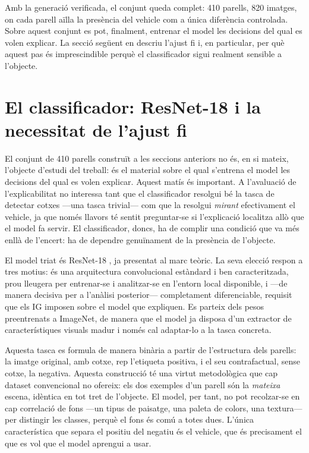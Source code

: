 Amb la generació verificada, el conjunt queda complet: 410 parells, 820 imatges, on cada parell aïlla la presència del vehicle com a única diferència controlada. Sobre aquest conjunt es pot, finalment, entrenar el model les decisions del qual es volen explicar. La secció següent en descriu l'ajust fi i, en particular, per què aquest pas és imprescindible perquè el classificador sigui realment sensible a l'objecte.

\section{El classificador: ResNet-18 i la necessitat de l'ajust fi} \label{sec:classificador}
El conjunt de 410 parells construït a les seccions anteriors no és, en si mateix, l'objecte d'estudi del treball: és el material sobre el qual s'entrena el model les decisions del qual es volen explicar. Aquest matís és important. A l'avaluació de l'explicabilitat no interessa tant que el classificador resolgui bé la tasca de detectar cotxes —una tasca trivial— com que la resolgui \emph{mirant} efectivament el vehicle, ja que només llavors té sentit preguntar-se si l'explicació localitza allò que el model fa servir. El classificador, doncs, ha de complir una condició que va més enllà de l'encert: ha de dependre genuïnament de la presència de l'objecte.

El model triat és ResNet-18 \cite{He2016}, ja presentat al marc teòric. La seva elecció respon a tres motius: és una arquitectura convolucional estàndard i ben caracteritzada, prou lleugera per entrenar-se i analitzar-se en l'entorn local disponible, i —de manera decisiva per a l'anàlisi posterior— completament diferenciable, requisit que els \ac{IG} imposen sobre el model que expliquen. Es parteix dels pesos preentrenats a ImageNet, de manera que el model ja disposa d'un extractor de característiques visuals madur i només cal adaptar-lo a la tasca concreta.

Aquesta tasca es formula de manera binària a partir de l'estructura dels parells: la imatge original, amb cotxe, rep l'etiqueta positiva, i el seu contrafactual, sense cotxe, la negativa. Aquesta construcció té una virtut metodològica que cap dataset convencional no ofereix: els dos exemples d'un parell són la \emph{mateixa} escena, idèntica en tot tret de l'objecte. El model, per tant, no pot recolzar-se en cap correlació de fons —un tipus de paisatge, una paleta de colors, una textura— per distingir les classes, perquè el fons és comú a totes dues. L'única característica que separa el positiu del negatiu és el vehicle, que és precisament el que es vol que el model aprengui a usar.

